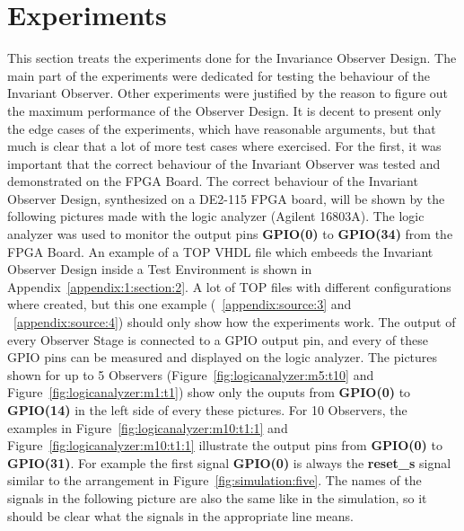 \section{Experiments}
\label{chapter:4:section:3}
This section treats the experiments done for the Invariance Observer Design. 
The main part of the experiments were dedicated for testing the behaviour of the Invariant Observer. 
Other experiments were justified by the reason to figure out the maximum performance of the Observer Design. 
It is decent to present only the edge cases of the experiments, which have reasonable arguments, but that much is clear that a lot of more test cases where exercised. 
For the first, it was important that the correct behaviour of the Invariant Observer was tested and demonstrated on the FPGA Board. 
The correct behaviour of the Invariant Observer Design, synthesized on a DE2-115 FPGA board, will be shown by the following pictures made with the logic analyzer (Agilent 16803A). 
The logic analyzer was used to monitor the output pins \textbf{GPIO(0)} to \textbf{GPIO(34)} from the FPGA Board. 
An example of a TOP VHDL file which embeeds the Invariant Observer Design inside a Test Environment is shown in Appendix~\ref{appendix:1:section:2}. 
A lot of TOP files with different configurations where created, but this one example (~\ref{appendix:source:3} and ~\ref{appendix:source:4}) should only show how the experiments work. 
The output of every Observer Stage is connected to a GPIO output pin, and every of these GPIO pins can be measured and displayed on the logic analyzer. 
The pictures shown for up to 5 Observers (Figure~\ref{fig:logicanalyzer:m5:t10} and Figure~\ref{fig:logicanalyzer:m1:t1}) show only the ouputs from \textbf{GPIO(0)} to \textbf{GPIO(14)} in the left side of every these pictures. 
For 10 Observers, the examples in Figure~\ref{fig:logicanalyzer:m10:t1:1} and Figure~\ref{fig:logicanalyzer:m10:t1:1} illustrate the output pins from \textbf{GPIO(0)} to \textbf{GPIO(31)}. 
For example the first signal \textbf{GPIO(0)} is always the \textbf{reset\_s} signal similar to the arrangement in Figure~\ref{fig:simulation:five}. 
The names of the signals in the following picture are also the same like in the simulation, so it should be clear what the signals in the appropriate line means. 

